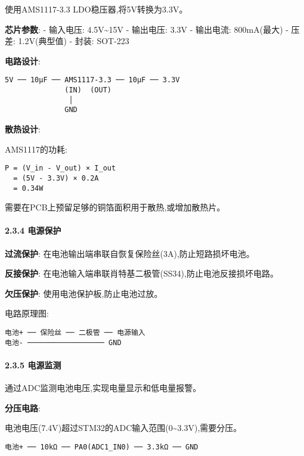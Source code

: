 \documentclass[
]{article}
\begin{document}
使用AMS1117-3.3 LDO稳压器,将5V转换为3.3V。

\textbf{芯片参数}: - 输入电压: 4.5V\textasciitilde15V - 输出电压: 3.3V -
输出电流: 800mA(最大) - 压差: 1.2V(典型值) - 封装: SOT-223

\textbf{电路设计}:

\begin{verbatim}
5V ── 10μF ── AMS1117-3.3 ── 10μF ── 3.3V
              (IN)  (OUT)
               │
              GND
\end{verbatim}

\textbf{散热设计}:

AMS1117的功耗:

\begin{verbatim}
P = (V_in - V_out) × I_out
  = (5V - 3.3V) × 0.2A
  = 0.34W
\end{verbatim}

需要在PCB上预留足够的铜箔面积用于散热,或增加散热片。

\hypertarget{ux7535ux6e90ux4fddux62a4}{%
\paragraph{2.3.4 电源保护}\label{ux7535ux6e90ux4fddux62a4}}

\textbf{过流保护}: 在电池输出端串联自恢复保险丝(3A),防止短路损坏电池。

\textbf{反接保护}:
在电池输入端串联肖特基二极管(SS34),防止电池反接损坏电路。

\textbf{欠压保护}: 使用电池保护板,防止电池过放。

电路原理图:

\begin{verbatim}
电池+ ── 保险丝 ── 二极管 ── 电源输入
电池- ────────────────── GND
\end{verbatim}

\hypertarget{ux7535ux6e90ux76d1ux6d4b}{%
\paragraph{2.3.5 电源监测}\label{ux7535ux6e90ux76d1ux6d4b}}

通过ADC监测电池电压,实现电量显示和低电量报警。

\textbf{分压电路}:

电池电压(7.4V)超过STM32的ADC输入范围(0\textasciitilde3.3V),需要分压。

\begin{verbatim}
电池+ ── 10kΩ ── PA0(ADC1_IN0) ── 3.3kΩ ── GND
\end{verbatim}
\end{document}
